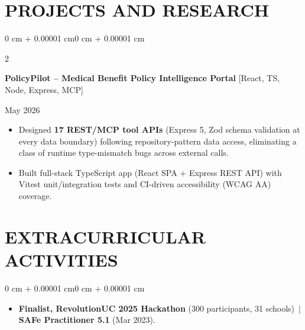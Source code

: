 \documentclass[10pt, letterpaper]{article}
\newenvironment{highlights}{
    \begin{itemize}[
        topsep=0.10 cm,
        parsep=0.06 cm,
        partopsep=0pt,
        itemsep=0.06 cm,
        leftmargin=12pt
    ]
}{
    \end{itemize}
}
\newenvironment{onecolentry}{
    \begin{adjustwidth}{0 cm + 0.00001 cm}{0 cm + 0.00001 cm}
}{
    \end{adjustwidth}
}
\newenvironment{twocolentry}[2][]{
    \onecolentry
    \def\secondColumn{#2}
    \setcolumnwidth{\fill, 4.5 cm}
    \begin{paracol}{2}
}{
    \switchcolumn \raggedleft \secondColumn
    \end{paracol}
    \endonecolentry
}
\begin{document}
\section{PROJECTS AND RESEARCH}
\begin{twocolentry}{May 2026}
\textbf{PolicyPilot -- Medical Benefit Policy Intelligence Portal} [React, TS, Node, Express, MCP]
\end{twocolentry}
\begin{highlights}
  \item Designed \textbf{17 REST/MCP tool APIs} (Express 5, Zod schema validation at every data boundary) following repository-pattern data access, eliminating a class of runtime type-mismatch bugs across external calls.
  \item Built full-stack TypeScript app (React SPA + Express REST API) with Vitest unit/integration tests and CI-driven accessibility (WCAG AA) coverage.
\end{highlights}

\section{EXTRACURRICULAR ACTIVITIES}
\begin{onecolentry}
\begin{highlights}
  \item \textbf{Finalist, RevolutionUC 2025 Hackathon} (300 participants, 31 schools) \,|\, \textbf{SAFe Practitioner 5.1} (Mar 2023).
\end{highlights}
\end{onecolentry}
\end{document}
